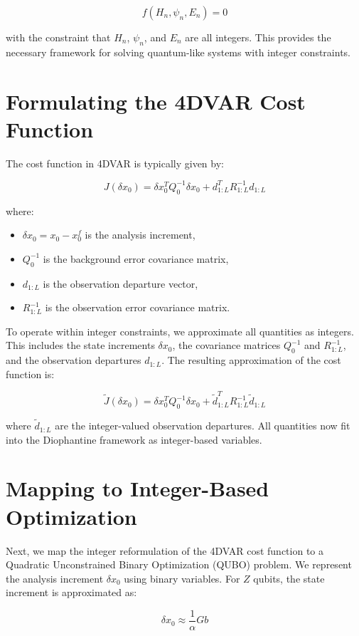 \documentclass{article}
\begin{document}
\[
f(H_n, \psi_n, E_n) = 0
\]

with the constraint that \( H_n \), \( \psi_n \), and \( E_n \) are all integers. This provides the necessary framework for solving quantum-like systems with integer constraints.

\section{Formulating the 4DVAR Cost Function}

The cost function in 4DVAR is typically given by:

\[
J (\delta x_0) = \delta x_0^T Q_0^{-1} \delta x_0 + d_{1:L}^T R_{1:L}^{-1} d_{1:L}
\]

where:
\begin{itemize}
    \item \( \delta x_0 = x_0 - x^f_0 \) is the analysis increment,
    \item \( Q_0^{-1} \) is the background error covariance matrix,
    \item \( d_{1:L} \) is the observation departure vector,
    \item \( R_{1:L}^{-1} \) is the observation error covariance matrix.
\end{itemize}

To operate within integer constraints, we approximate all quantities as integers. This includes the state increments \( \delta x_0 \), the covariance matrices \( Q_0^{-1} \) and \( R_{1:L}^{-1} \), and the observation departures \( d_{1:L} \). The resulting approximation of the cost function is:

\[
\tilde{J}(\delta x_0) = \delta x_0^T Q_0^{-1} \delta x_0 + \tilde{d}_{1:L}^T R_{1:L}^{-1} \tilde{d}_{1:L}
\]

where \( \tilde{d}_{1:L} \) are the integer-valued observation departures. All quantities now fit into the Diophantine framework as integer-based variables.

\section{Mapping to Integer-Based Optimization}

Next, we map the integer reformulation of the 4DVAR cost function to a Quadratic Unconstrained Binary Optimization (QUBO) problem. We represent the analysis increment \( \delta x_0 \) using binary variables. For \( Z \) qubits, the state increment is approximated as:

\[
\delta x_0 \approx \frac{1}{\alpha} G b
\]
\end{document}
